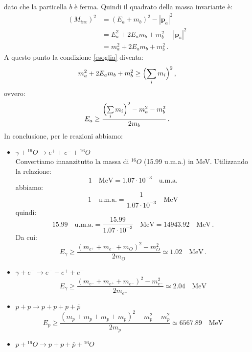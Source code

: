 \documentclass[twoside]{article}
\begin{document}
dato che la particella $b$ è ferma. Quindi il quadrato della massa invariante è:
\begin{align*}
(M_{inv})^2&=(E_a+m_b)^2-|\mathbf{p}_a|^2 \\
&=E_a^2+2E_a m_b+m_b^2-|\mathbf{p}_a|^2 \\
&=m_a^2+2E_am_b+m_b^2 \, .
\end{align*}
A questo punto la condizione \ref{esoglia} diventa:
\begin{equation*}
m_a^2+2E_am_b+m_b^2 \geq \Bigl( \sum\limits_{i} m_i \Bigr)^2 \, ,
\end{equation*}
ovvero:
\begin{equation}
E_a \geq \frac{ \Bigl( \sum\limits_{i} m_i \Bigr)^2 - m_a^2-m_b^2}{2m_b} \, .
\end{equation}
In conclusione, per le reazioni abbiamo:
\begin{itemize}
\item $\gamma + {}^{16}O \longrightarrow e^+ + e^- + {}^{16}O $ \\
Convertiamo innanzitutto la massa di ${}^{16}O$ (15.99 u.m.a.) in MeV. Utilizzando la relazione:
\begin{equation}
1 \quad \text{MeV}=1.07 \cdot 10^{-3} \quad \text{u.m.a.}
\end{equation}
abbiamo:
\begin{equation}
1 \quad \text{u.m.a.}=\frac{1}{1.07 \cdot 10^{-3}} \quad \text{MeV}
\end{equation}
quindi:
\begin{equation*}
15.99 \quad \text{u.m.a.}=\frac{15.99}{1.07 \cdot 10^{-3}} \quad \text{MeV}=14943.92 \quad \text{MeV} \, .
\end{equation*}
Da cui:
\begin{equation*}
E_{\gamma} \geq \frac{(m_{e^+}+m_{e^-}+m_O)^2 - m_O^2}{2m_O} \simeq 1.02 \quad \text{MeV} \, .
\end{equation*}
\item $\gamma + e^- \longrightarrow e^- + e^+ +e^- $
\begin{equation*}
E_{\gamma} \geq \frac{(m_{e^-}+m_{e^+}+m_{e^-})^2-m_{e^-}^2}{2m_{e^-}} \simeq 2.04 \quad \text{MeV}
\end{equation*}
\item $p+p \longrightarrow p + p + p + \overline{p} $
\begin{equation*}
E_p \geq \frac{(m_p+m_p+m_p+m_{\overline{p}})^2-m_p^2-m_p^2}{2m_p} \simeq 6567.89 \quad \text{MeV}
\end{equation*}
\item $p+ {}^{16}O \longrightarrow p + p + \overline{p} + {}^{16}O $

\end{itemize}
\end{document}
